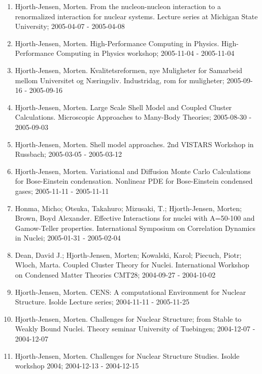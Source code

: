\documentclass[%
oneside,                 %
final,                   %
10pt]{article}
\begin{document}
\begin{enumerate}
\item Hjorth-Jensen, Morten.  From the nucleon-nucleon interaction to a renormalized interaction for nuclear systems. Lecture series at Michigan State University; 2005-04-07 - 2005-04-08

\item Hjorth-Jensen, Morten.  High-Performance Computing in Physics. High-Performance Computing in Physics workshop; 2005-11-04 - 2005-11-04

\item Hjorth-Jensen, Morten.  Kvalitetsreformen, nye Muligheter for Samarbeid mellom Universitet og Næringsliv. Industridag, rom for muligheter; 2005-09-16 - 2005-09-16

\item Hjorth-Jensen, Morten.  Large Scale Shell Model and Coupled Cluster Calculations. Microscopic Approaches to Many-Body Theories; 2005-08-30 - 2005-09-03

\item Hjorth-Jensen, Morten.  Shell model approaches. 2nd VISTARS Workshop in Russbach; 2005-03-05 - 2005-03-12

\item Hjorth-Jensen, Morten.  Variational and Diffusion Monte Carlo Calculations for Bose-Einstein condensation. Nonlinear PDE for Bose-Einstein condensed gases; 2005-11-11 - 2005-11-11

\item Honma, Micho; Otsuka, Takahuro; Mizusaki, T.; Hjorth-Jensen, Morten; Brown, Boyd Alexander. Effective Interactions for nuclei with A=50-100 and Gamow-Teller properties. International Symposium on Correlation Dynamics in Nuclei; 2005-01-31 - 2005-02-04

\item Dean, David J.; Hjorth-Jensen, Morten; Kowalski, Karol; Piecuch, Piotr; Wloch, Marta. Coupled Cluster Theory for Nuclei. International Workshop on Condensed Matter Theories CMT28; 2004-09-27 - 2004-10-02

\item Hjorth-Jensen, Morten. CENS: A computational Environment for Nuclear Structure. Isolde Lecture series; 2004-11-11 - 2005-11-25

\item Hjorth-Jensen, Morten.  Challenges for Nuclear Structure; from Stable to Weakly Bound Nuclei. Theory seminar University of Tuebingen; 2004-12-07 - 2004-12-07

\item Hjorth-Jensen, Morten.  Challenges for Nuclear Structure Studies. Isolde workshop 2004; 2004-12-13 - 2004-12-15


\end{enumerate}
\end{document}
